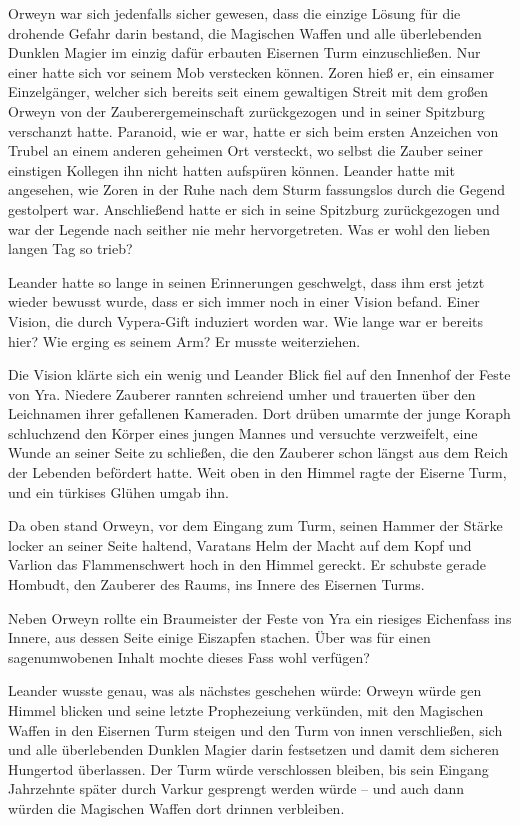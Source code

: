 Orweyn war sich jedenfalls sicher gewesen, dass die einzige Lösung für die drohende Gefahr darin bestand, die Magischen Waffen und alle überlebenden Dunklen Magier im einzig dafür erbauten Eisernen Turm einzuschließen. Nur einer hatte sich vor seinem Mob verstecken können. Zoren hieß er, ein einsamer Einzelgänger, welcher sich bereits seit einem gewaltigen Streit mit dem großen Orweyn von der Zauberergemeinschaft zurückgezogen und in seiner Spitzburg verschanzt hatte. Paranoid, wie er war, hatte er sich beim ersten Anzeichen von Trubel an einem anderen geheimen Ort versteckt, wo selbst die Zauber seiner einstigen Kollegen ihn nicht hatten aufspüren können. Leander hatte mit angesehen, wie Zoren in der Ruhe nach dem Sturm fassungslos durch die Gegend gestolpert war. Anschließend hatte er sich in seine Spitzburg zurückgezogen und war der Legende nach seither nie mehr hervorgetreten. Was er wohl den lieben langen Tag so trieb?

Leander hatte so lange in seinen Erinnerungen geschwelgt, dass ihm erst jetzt wieder bewusst wurde, dass er sich immer noch in einer Vision befand. Einer Vision, die durch Vypera-Gift induziert worden war. Wie lange war er bereits hier? Wie erging es seinem Arm? Er musste weiterziehen.

Die Vision klärte sich ein wenig und Leander Blick fiel auf den Innenhof der Feste von Yra. Niedere Zauberer rannten schreiend umher und trauerten über den Leichnamen ihrer gefallenen Kameraden. Dort drüben umarmte der junge Koraph schluchzend den Körper eines jungen Mannes und versuchte verzweifelt, eine Wunde an seiner Seite zu schließen, die den Zauberer schon längst aus dem Reich der Lebenden befördert hatte. Weit oben in den Himmel ragte der Eiserne Turm, und ein türkises Glühen umgab ihn.

Da oben stand Orweyn, vor dem Eingang zum Turm, seinen Hammer der Stärke locker an seiner Seite haltend, Varatans Helm der Macht auf dem Kopf und Varlion das Flammenschwert hoch in den Himmel gereckt. Er schubste gerade Hombudt, den Zauberer des Raums, ins Innere des Eisernen Turms.

Neben Orweyn rollte ein Braumeister der Feste von Yra ein riesiges Eichenfass ins Innere, aus dessen Seite einige Eiszapfen stachen. Über was für einen sagenumwobenen Inhalt mochte dieses Fass wohl verfügen?

Leander wusste genau, was als nächstes geschehen würde: Orweyn würde gen Himmel blicken und seine letzte Prophezeiung verkünden, mit den Magischen Waffen in den Eisernen Turm steigen und den Turm von innen verschließen, sich und alle überlebenden Dunklen Magier darin festsetzen und damit dem sicheren Hungertod überlassen. Der Turm würde verschlossen bleiben, bis sein Eingang Jahrzehnte später durch Varkur gesprengt werden würde – und auch dann würden die Magischen Waffen dort drinnen verbleiben.

